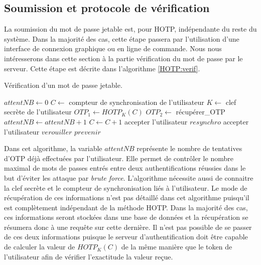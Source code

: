 \documentclass{../res/univ-projet}
\begin{document}
  \subsection{Soumission et protocole de vérification}
  La soumission du mot de passe jetable est, pour HOTP, indépendante du reste du système. Dans la majorité des cas, cette étape passera par l'utilisation d'une interface 
  de connexion graphique ou en ligne de commande. Nous nous intéresserons dans cette section à la partie vérification du mot de passe par le serveur. Cette étape est 
  décrite dans l'algorithme \ref{HOTP:verif}.  
  \begin{algorithm}
    \caption{Vérification d'un mot de passe jetable.}
    \label{HOTP:verif}
    
    \begin{algorithmic}
      \STATE $attentNB \leftarrow 0$
      \STATE $C \leftarrow$ compteur de synchronisation de l'utilisateur
      \STATE $K \leftarrow$ clef secrète de l'utilisateur
      \STATE $OTP_1 \leftarrow HOTP_K(C)$
        \STATE $OTP_2 \leftarrow$ récupérer\_OTP
        \STATE $attentNB \leftarrow attentNB + 1$
          \STATE $C \leftarrow C + 1$
          \STATE accepter l'utilisateur
        \ELSE
            \STATE $resynchro$
            \STATE accepter l'utilisateur
          \ENDIF
        \ENDIF
      \ENDWHILE
      \STATE $verouiller$
      \STATE $prevenir$
    \end{algorithmic}
  \end{algorithm}
  
  Dans cet algorithme, la variable $attentNB$ représente le nombre de tentatives d'OTP déjà effectuées par l'utilisateur. Elle permet de contrôler le nombre maximal de mots 
  de passes entrés entre deux authentifications réussies dans le but d'éviter les attaque par \emph{brute force}.
  L'algorithme nécessite aussi de connaitre la clef secrète et le compteur de synchronisation liés à l'utilisateur. Le mode de récupération de ces informations n'est pas 
  détaillé dans cet algorithme puisqu'il est complètement indépendant de la méthode HOTP. Dans la majorité des cas, ces informations seront stockées dans une base de 
  données et la récupération se résumera donc à une requête sur cette dernière. Il n'est pas possible de se passer de ces deux informations puisque le serveur 
  d'authentification doit être capable de calculer la valeur de $HOTP_K(C)$ de la même manière que le token de l'utilisateur afin de vérifier l'exactitude la valeur 
  reçue.
  
\end{document}
